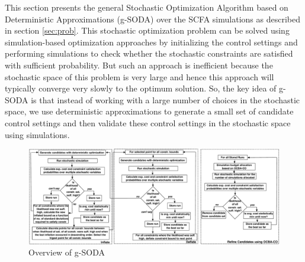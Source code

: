 \documentclass[a4paper, 12pt]{article} %
\begin{document}
This section presents the general Stochastic Optimization Algorithm based on Deterministic Approximations (g-SODA) over the SCFA simulations as described in section \ref{sec:prob}. 
This stochastic optimization problem can be solved using simulation-based optimization approaches by initializing the control settings and performing simulations to check whether the stochastic constraints are satisfied with sufficient probability.
But such an approach is inefficient because the stochastic space of this problem is very large and hence this approach will typically converge very slowly to the optimum solution.
So, the key idea of g-SODA is that instead of working with a large number of choices in the stochastic space, we use deterministic approximations to generate a small set of candidate control settings and then validate these control settings in the stochastic space using simulations.


\begin{figure}
	\includegraphics[width=\textwidth]{images/Algo_Full.pdf}
	\caption{Overview of g-SODA}
	\label{fig:algoOverview}       %
\end{figure}


\newcommand{\algoSODAm}{Algorithm 1}
\newcommand{\algoInflDefl}{Algorithm 2}
\newcommand{\algoPerfInfl}{Algorithm 3}
\newcommand{\algoInflate}{Algorithm 4}
\newcommand{\algoPerfDefl}{Algorithm 5}
\newcommand{\algoDeflate}{Algorithm 6}
\newcommand{\algoRefineCand}{Algorithm 7}
\newcommand{\algoExOCBA}{Algorithm 8}
\newcommand{\algoStochSim}{Algorithm 9}
\end{document}
